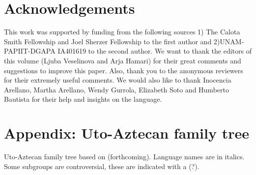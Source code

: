 \documentclass[output=paper]{langsci/langscibook}
\begin{document}
\section*{Acknowledgements}
This work was supported by funding from the following sources 1) The Calota Smith Fellowship and Joel Sherzer Fellowship to the first author and 2)UNAM-PAPIIT-DGAPA IA401619 to the second author. We want to thank the editors of this volume (Ljuba Veselinova and Arja Hamari) for their great comments and
suggestions to improve this paper. Also, thank you to the anonymous reviewers for their extremely
useful comments. We would also like to thank Inocencia Arellano, Martha Arellano, Wendy Gurrola, Elizabeth Soto and Humberto Bautista for their help and insights on the language.

\newpage
\section*{Appendix: Uto-Aztecan family tree}
Uto-Aztecan family tree based on \citeauthor{haugen2019} (forthcoming). Language names are in italics. Some subgroups are controversial, these are indicated with a (?).


\medskip

\end{document}
